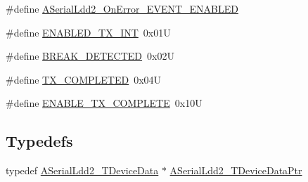 \begin{DoxyCompactItemize}
\item 
\#define \hyperlink{group___a_serial_ldd2__module_gadba446a2ac10bec7ef67f2dae167bc86}{A\-Serial\-Ldd2\-\_\-\-On\-Error\-\_\-\-E\-V\-E\-N\-T\-\_\-\-E\-N\-A\-B\-L\-E\-D}
\item 
\#define \hyperlink{group___a_serial_ldd2__module_gab05896dbf11eed7f4078978e7287669d}{E\-N\-A\-B\-L\-E\-D\-\_\-\-T\-X\-\_\-\-I\-N\-T}~0x01\-U
\item 
\#define \hyperlink{group___a_serial_ldd2__module_ga617e6f524bf659f58012c8f0248004e5}{B\-R\-E\-A\-K\-\_\-\-D\-E\-T\-E\-C\-T\-E\-D}~0x02\-U
\item 
\#define \hyperlink{group___a_serial_ldd2__module_ga1f79d891cf81d9f65cccd3a0ab84b1ee}{T\-X\-\_\-\-C\-O\-M\-P\-L\-E\-T\-E\-D}~0x04\-U
\item 
\#define \hyperlink{group___a_serial_ldd2__module_gac0fc7ebba74ca47c17389980225ddf48}{E\-N\-A\-B\-L\-E\-\_\-\-T\-X\-\_\-\-C\-O\-M\-P\-L\-E\-T\-E}~0x10\-U
\end{DoxyCompactItemize}
\subsection*{Typedefs}
\begin{DoxyCompactItemize}
\item 
typedef \hyperlink{struct_a_serial_ldd2___t_device_data}{A\-Serial\-Ldd2\-\_\-\-T\-Device\-Data} $\ast$ \hyperlink{group___a_serial_ldd2__module_ga2484df348f7d69cde065232de2522016}{A\-Serial\-Ldd2\-\_\-\-T\-Device\-Data\-Ptr}
\end{DoxyCompactItemize}

